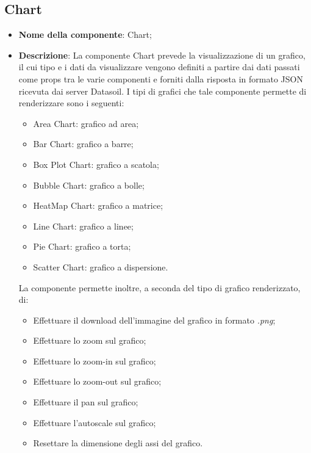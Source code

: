\subsection{Chart}
\begin{itemize}
      \item \textbf{Nome della componente}: Chart;
      \item \textbf{Descrizione}: La componente Chart prevede la visualizzazione di un grafico, il cui tipo e i dati da visualizzare vengono definiti a partire dai dati passati
            come props tra le varie componenti e forniti dalla risposta in formato JSON ricevuta dai server Datasoil. \newline
            I tipi di grafici che tale componente permette di renderizzare sono i seguenti:
            \begin{itemize}
                  \item Area Chart: grafico ad area;
                  \item Bar Chart: grafico a barre;
                  \item Box Plot Chart: grafico a scatola;
                  \item Bubble Chart: grafico a bolle;
                  \item HeatMap Chart: grafico a matrice;
                  \item Line Chart: grafico a linee;
                  \item Pie Chart: grafico a torta;
                  \item Scatter Chart: grafico a dispersione.
            \end{itemize}
            La componente permette inoltre, a seconda del tipo di grafico renderizzato, di:
            \begin{itemize}
                  \item Effettuare il download dell'immagine del grafico in formato \textit{.png};
                  \item Effettuare lo zoom sul grafico;
                  \item Effettuare lo zoom-in sul grafico;
                  \item Effettuare lo zoom-out sul grafico;
                  \item Effettuare il pan sul grafico;
                  \item Effettuare l'autoscale sul grafico;
                  \item Resettare la dimensione degli assi del grafico.

\end{itemize}
\end{itemize}
